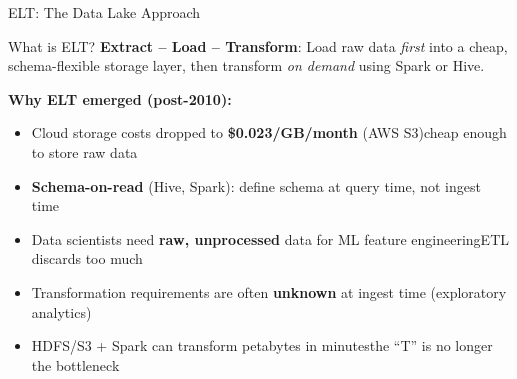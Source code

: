 \documentclass[aspectratio=169,10pt]{beamer}
\begin{document}
\begin{frame}{ELT: The Data Lake Approach}
 
      \begin{block}{What is ELT?}
        \textbf{Extract -- Load -- Transform}: Load raw data \emph{first} into a cheap, schema-flexible storage layer, then transform \emph{on demand} using Spark or Hive.
      \end{block}
      \vspace{6pt}
      \textbf{Why ELT emerged (post-2010):}
      \begin{itemize}
        \item Cloud storage costs dropped to \textbf{\$0.023/GB/month} (AWS S3)\textemdash cheap enough to store raw data
        \item \textbf{Schema-on-read} (Hive, Spark): define schema at query time, not ingest time
        \item Data scientists need \textbf{raw, unprocessed} data for ML feature engineering\textemdash ETL discards too much
        \item Transformation requirements are often \textbf{unknown} at ingest time (exploratory analytics)
        \item HDFS/S3 + Spark can transform petabytes in minutes\textemdash the ``T'' is no longer the bottleneck
      \end{itemize}
 
\end{frame}
\end{document}
